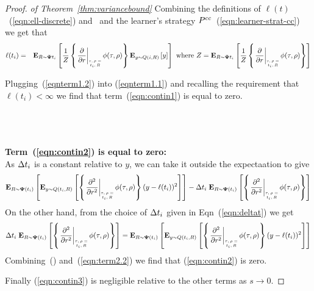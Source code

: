 \documentclass[anon,12pt]{colt2024} %
\begin{document}
\begin{proof} {\em of Theorem~\ref{thm:variancebound}}
Combining the definitions of $\ell(t)$~(\ref{eqn:ell-discrete}) and~
and the learner's strategy
$P^{cc}$~(\ref{eqn:learner-strat-cc}) we get that
\begin{eqnarray}
\ell(t_i) &=& \E{\R \sim \state{t_i}}{\frac{1}{Z}
              \at{\frac{\partial}{\partial r}}
              \E{y \sim \adversM(i,\R)}{y}} \mbox{ where }
              Z=\E{\R \sim \state{t_i}}{\frac{1}{Z}
              \at{\frac{\partial}{\partial r}}}
              \label{eqnterm1.2}
\end{eqnarray}

Plugging~(\ref{eqnterm1.2}) into (\ref{eqnterm1.1}) and recalling the
requirement that $\ell(t_i)<\infty$ we find that
term~(\ref{eqn:contin1}) is equal to zero.


~\\~\\~\\
{\bf Term~(\ref{eqn:contin2}) is equal to zero:}\\
As $\Delta t_i$ is a constant relative to $y$, we can take it
outside the expectaation to give 
\begin{equation} \label{eqn:term2.1}
  \E{\R \sim \state(t_i)}{\E{y \sim
      \adversM(t_i,\R)}{\at{\frac{\partial^2}{\partial r^2}}
      (y-\ell(t_i))^2}}
  - \deltat_i  \;  \E{\R \sim \state(t_i)}{\at{\frac{\partial^2}{\partial r^2}}}
\end{equation}
On the other hand, from the choice of $\Delta t_i$ given in
Eqn~(\ref{eqn:deltat}) we get
\begin{equation} \label{eqn:term2.2}
  \deltat_i \; \E{\R \sim \state(t_i)}{\at{\frac{\partial^2}{\partial r^2}}} = 
  \E{\R \sim \state(t_i)}{\E{y \sim \adversM(t_i,R)}{
      \at{\frac{\partial^2}{\partial r^2}} (y-\ell(t_i))^2}}
\end{equation}
Combining~(\label{eqn:term2.1}) and~(\ref{eqn:term2.2}) we
find that (\ref{eqn:contin2}) is zero.

Finally (\ref{eqn:contin3}) is negligible relative to the other terms
as $s \to 0$.
\end{proof} 
\end{document}
